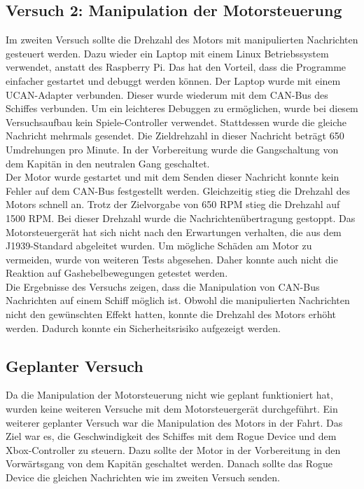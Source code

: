 \subsection{Versuch 2: Manipulation der Motorsteuerung}
Im zweiten Versuch sollte die Drehzahl des Motors mit manipulierten Nachrichten gesteuert werden.
Dazu wieder ein Laptop mit einem Linux Betriebssystem verwendet, anstatt des Raspberry Pi. 
Das hat den Vorteil, dass
die Programme einfacher gestartet und debuggt werden können. Der Laptop wurde mit einem UCAN-Adapter verbunden.  
Dieser wurde wiederum mit dem CAN-Bus des Schiffes verbunden. Um ein leichteres Debuggen zu ermöglichen, wurde bei diesem 
Versuchsaufbau kein Spiele-Controller verwendet. Stattdessen wurde die gleiche Nachricht mehrmals gesendet. Die Zieldrehzahl in 
dieser Nachricht beträgt 650 Umdrehungen pro Minute. In der Vorbereitung wurde die Gangschaltung von dem Kapitän in den neutralen
Gang geschaltet. \\
Der Motor wurde gestartet und mit dem
Senden dieser Nachricht konnte kein Fehler auf dem CAN-Bus festgestellt werden. Gleichzeitig stieg die Drehzahl des Motors
schnell an. Trotz der Zielvorgabe von 650 RPM stieg die Drehzahl auf 1500 RPM. Bei dieser Drehzahl wurde 
die Nachrichtenübertragung gestoppt. Das Motorsteuergerät hat sich nicht nach den Erwartungen verhalten,
die aus dem J1939-Standard abgeleitet wurden. Um mögliche Schäden am Motor zu vermeiden, wurde von weiteren Tests abgesehen.
Daher konnte auch nicht die Reaktion auf Gashebelbewegungen getestet werden. \\
Die Ergebnisse des Versuchs zeigen, dass die Manipulation von CAN-Bus Nachrichten auf einem Schiff möglich ist.
Obwohl die manipulierten Nachrichten nicht den gewünschten Effekt hatten, konnte die Drehzahl des Motors erhöht werden.
Dadurch konnte ein Sicherheitsrisiko aufgezeigt werden. 

\subsection{Geplanter Versuch}
Da die Manipulation der Motorsteuerung nicht wie geplant funktioniert hat, 
wurden keine weiteren Versuche mit dem Motorsteuergerät durchgeführt. Ein weiterer geplanter Versuch 
war die Manipulation des Motors in der Fahrt. Das Ziel war es, die Geschwindigkeit des Schiffes mit dem Rogue Device und 
dem Xbox-Controller zu steuern.
Dazu sollte der Motor in der Vorbereitung in den Vorwärtsgang von dem Kapitän geschaltet werden.
Danach sollte das Rogue Device die gleichen Nachrichten wie im zweiten Versuch senden.

